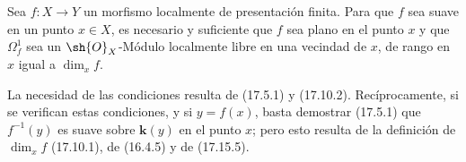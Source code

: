 \begin{proposition}[17.15.15]
\label{IV.17.15.15}
Sea $f:X\to Y$ un morfismo localmente de presentación finita. Para que $f$ sea suave en un punto $x\in X$, es necesario y suficiente que $f$ sea plano en el punto $x$ y que $\varOmega^1_f$ sea un $\sh{O}_X$-Módulo localmente libre en una vecindad de $x$, de rango en $x$ igual a $\dim_x f$.
\end{proposition}

La necesidad de las condiciones resulta de (17.5.1) y (17.10.2). Recíprocamente, si se verifican estas condiciones, y si $y=f(x)$, basta demostrar (17.5.1) que $f^{-1}(y)$ es suave sobre $\boldsymbol{k}(y)$ en el punto $x$; pero esto resulta de la definición de $\dim_x f$ (17.10.1), de (16.4.5) y de (17.15.5).
